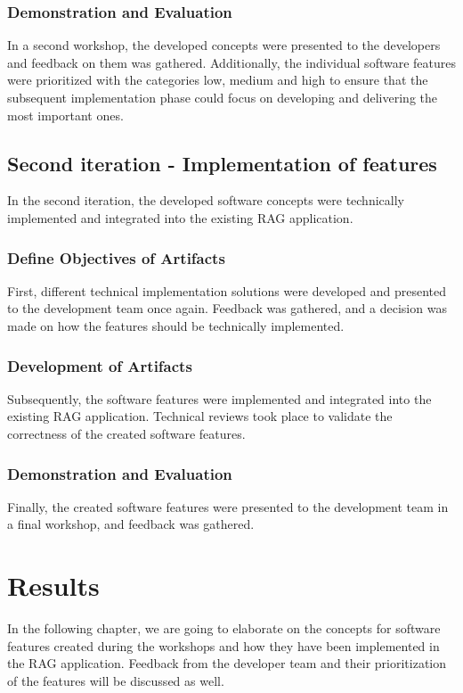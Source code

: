 \documentclass[
	english,
	ruledheaders=section,%
	class=report,%
	thesis={type=bachelor},%
	accentcolor=1b,%
	custommargins=true,%
	marginpar=false,%
	parskip=half-,%
	fontsize=11pt,%
	DIV=14,
]{tudapub}
\begin{document}
\subsection{Demonstration and Evaluation}
In a second workshop, the developed concepts were presented to the developers and feedback on them was gathered. Additionally, the individual software features were prioritized with the categories low, medium and high to ensure that the subsequent implementation phase could focus on developing and delivering the most important ones.
\section{Second iteration - Implementation of features}
In the second iteration, the developed software concepts were technically implemented and integrated into the existing RAG application.
\subsection{Define Objectives of Artifacts}
First, different technical implementation solutions were developed and presented to the development team once again. Feedback was gathered, and a decision was made on how the features should be technically implemented.
\subsection{Development of Artifacts}
Subsequently, the software features were implemented and integrated into the existing RAG application. Technical reviews took place to validate the correctness of the created software features.
\subsection{Demonstration and Evaluation}
Finally, the created software features were presented to the development team in a final workshop, and feedback was gathered.
\chapter{Results}
In the following chapter, we are going to elaborate on the concepts for software features created during the workshops and how they have been implemented in the RAG application. Feedback from the developer team and their prioritization of the features will be discussed as well.
\end{document}
